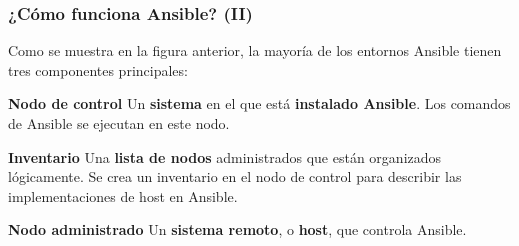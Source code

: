 \documentclass[
	11pt, %
]{beamer}
\begin{document}

\begin{frame}
	\frametitle{¿Cómo funciona Ansible? (II)}

	Como se muestra en la figura anterior, la mayoría de los entornos Ansible tienen tres componentes principales:

	\begin{block}{\textbf{Nodo de control}}
		Un \textbf{sistema} en el que está \textbf{instalado Ansible}. Los comandos de Ansible se ejecutan en este nodo.
	\end{block}

	\begin{exampleblock}{\textbf{Inventario}}
		Una \textbf{lista de nodos} administrados que están organizados lógicamente. Se crea un inventario en el nodo de control para describir las implementaciones de host en Ansible.
	\end{exampleblock}

	\begin{alertblock}{\textbf{Nodo administrado}}
		Un \textbf{sistema remoto}, o \textbf{host}, que controla Ansible.
	\end{alertblock}

\end{frame}

\end{document}
